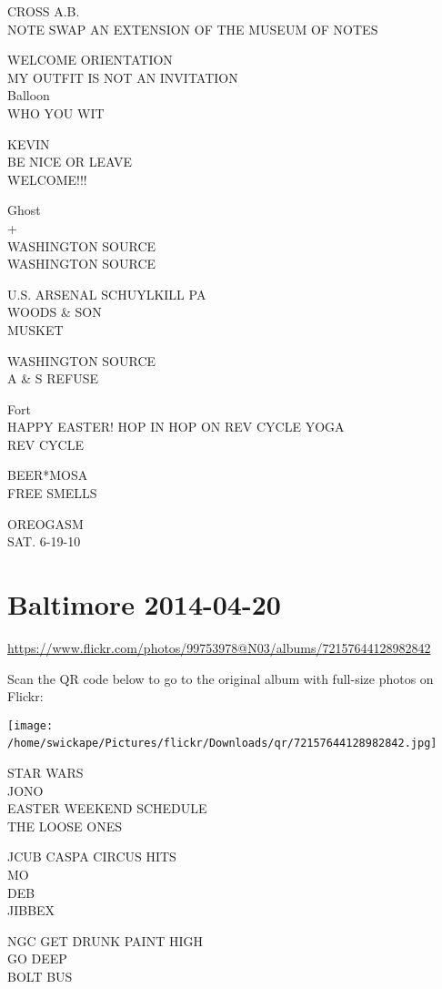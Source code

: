 \documentclass[10pt,letterpaper]{article}
\begin{document}
CROSS A.B.\\
NOTE SWAP AN EXTENSION OF THE MUSEUM OF NOTES

WELCOME ORIENTATION\\
MY OUTFIT IS NOT AN INVITATION\\
Balloon\\
WHO YOU WIT

KEVIN\\
BE NICE OR LEAVE\\
WELCOME!!!

Ghost\\
+\\
WASHINGTON SOURCE\\
WASHINGTON SOURCE

U.S. ARSENAL SCHUYLKILL PA\\
WOODS \& SON\\
MUSKET

WASHINGTON SOURCE\\
A \& S REFUSE

Fort\\
HAPPY EASTER! HOP IN HOP ON REV CYCLE YOGA\\
REV CYCLE

BEER*MOSA\\
FREE SMELLS

OREOGASM\\
SAT. 6{-}19{-}10
\

\section*{Baltimore 2014-04-20}

\url{https://www.flickr.com/photos/99753978@N03/albums/72157644128982842}

Scan the QR code below to go to the original album with full-size photos on Flickr:

\texttt{[image: /home/swickape/Pictures/flickr/Downloads/qr/72157644128982842.jpg]}
\

STAR WARS\\
JONO\\
EASTER WEEKEND SCHEDULE\\
THE LOOSE ONES

JCUB CASPA CIRCUS HITS\\
MO\\
DEB\\
JIBBEX

NGC GET DRUNK PAINT HIGH\\
GO DEEP\\
BOLT BUS
\end{document}

